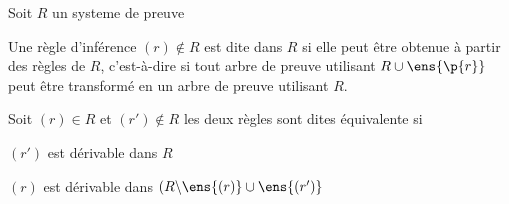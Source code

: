     \begin{definition}{}
        Soit $R$ un systeme de preuve
        \begin{enumerate}
            \itast Une règle d'inférence $(r) \notin R$ est dite  dans $R$ si elle peut être obtenue à partir des règles de $R$, c'est-à-dire si tout arbre de preuve utilisant $R \cup \ens{\p{r}}$ peut être transformé en un arbre de preuve utilisant $R$.
            
            \itast Soit $(r) \in R$ et $(r') \notin R$ les deux règles sont dites équivalente si
            
            \begin{enumerate}
                \itt $(r')$ est dérivable dans $R$
                
                \itt $(r)$ est dérivable dans $(R \backslash \ens{(r)} \cup \ens{(r')}$
            \end{enumerate}
        \end{enumerate}
    \end{definition}
    
